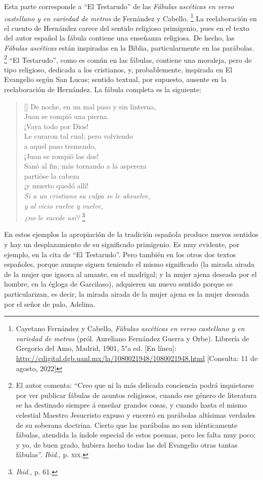 \documentclass[14pt,twoside,final]{extbook} %
\let\oldfootnote\footnote
\renewcommand\footnote[1]{%
\oldfootnote{\hspace{1mm}#1}}
\begin{document}
Esta parte corresponde a ``El Testarudo'' de las \emph{Fábulas ascéticas en verso castellano y en variedad de metros} de Fernández y Cabello.\footnote{Cayetano Fernández y Cabello, \emph{Fábulas ascéticas en verso castellano y en variedad de metros} (pról. Aureliano Fernández Guerra y Orbe). Librería de Gregorio del Amo, Madrid, 1901, 5"a ed. [En línea]: \url{http://cdigital.dgb.uanl.mx/la/1080021948/1080021948.html} [Consulta: 11 de agosto, 2022]} La reelaboración en el cuento de Hernández carece del sentido religioso primigenio, pues en el texto del autor español la fábula contiene una enseñanza religiosa. De hecho, las \emph{Fábulas ascéticas} están inspiradas en la Biblia, particularmente en las parábolas.\footnote{El autor comenta: ``Creo que ni la más delicada conciencia podrá inquietarse por ver publicar fábulas de asuntos religiosos, cuando ese género de literatura se ha destinado siempre á enseñar grandes cosas, y cuando hasta el mismo celestial Maestro Jesucristo expuso y encerró en parábolas altísimas verdades de su soberana doctrina. Cierto que las parábolas no son idénticamente fábulas, atendida la índole especial de estos poemas, pero les falta muy poco; y yo, de buen grado, hubiera hecho todas las del Evangelio otras tantas fábulas''. \emph{Ibid.}, p. \textsc{xix}.} ``El Testarudo'', como es común en las fábulas, contiene una moraleja, pero de tipo religioso, dedicada a los cristianos, y, probablemente, inspirada en El Evangelio según San Lucas; sentido textual, por supuesto, ausente en la reelaboración de Hernández. La fábula completa es la siguiente:
\settowidth{\versewidth}{Si a un cristiano su culpa se le absuelve,}
\begin{verse}[\versewidth]
De noche, en un mal paso y sin linterna, \\
Juan se rompió una pierna. \\
¡Vaya todo por Dios! \\
Le curaron tal cual; pero volviendo \\
a aquel paso tremendo, \\
¡Juan se rompió las dos! \\
Sanó al fin; más tornando a la aspereza \\
partióse la cabeza \\
¡y muerto quedó allí! \\
\emph{Si a un cristiano su culpa se le absuelve, \\
y al vicio vuelve y vuelve, \\
¿no le sucede así?}\footnote{\emph{Ibid.}, p. 61.}
\end{verse}
En estos ejemplos la apropiación de la tradición española produce nuevos sentidos y hay un desplazamiento de su significado primigenio. Es muy evidente, por ejemplo, en la cita de ``El Testarudo''. Pero también en los otros dos textos españoles, porque aunque siguen teniendo el mismo significado (la mirada airada de la mujer que ignora al amante, en el madrigal; y la mujer ajena deseada por el hombre, en la égloga de Garcilaso), adquieren un nuevo sentido porque se particularizan, es decir, la mirada airada de la mujer ajena es la mujer deseada por el señor de palo, Adelina.
\end{document}
